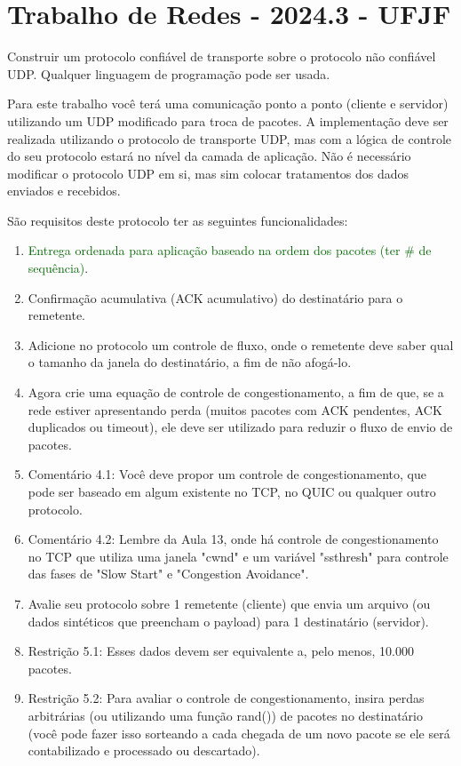 \documentclass[12pt]{article}
\begin{document}
\section*{Trabalho de Redes - 2024.3 - UFJF}

Construir um protocolo confiável de transporte sobre o protocolo não confiável UDP. Qualquer linguagem de programação pode ser usada.

\vspace{2em}

Para este trabalho você terá uma comunicação ponto a ponto (cliente e servidor) utilizando um UDP modificado para troca de pacotes. A implementação deve ser realizada utilizando o protocolo de transporte UDP, mas com a lógica de controle do seu protocolo estará no nível da camada de aplicação. Não é necessário modificar o protocolo UDP em si, mas sim colocar tratamentos dos dados enviados e recebidos.

São requisitos deste protocolo ter as seguintes funcionalidades:

\begin{enumerate}
    \item \textcolor{darkgreen}{Entrega ordenada para aplicação baseado na ordem dos pacotes (ter \# de sequência)}.
    \item Confirmação acumulativa (ACK acumulativo) do destinatário para o remetente.
    \item Adicione no protocolo um controle de fluxo, onde o remetente deve saber qual o tamanho da janela do destinatário, a fim de não afogá-lo.
    \item Agora crie uma equação de controle de congestionamento, a fim de que, se a rede estiver apresentando perda (muitos pacotes com ACK pendentes, ACK duplicados ou timeout), ele deve ser utilizado para reduzir o fluxo de envio de pacotes. 
    \item Comentário 4.1: Você deve propor um controle de congestionamento, que pode ser baseado em algum existente no TCP, no QUIC ou qualquer outro protocolo. 
    \item Comentário 4.2: Lembre da Aula 13, onde há controle de congestionamento no TCP que utiliza uma janela "cwnd" e um variável "ssthresh" para controle das fases de "Slow Start" e "Congestion Avoidance".
    \item Avalie seu protocolo sobre 1 remetente (cliente) que envia um arquivo (ou dados sintéticos que preencham o payload) para 1 destinatário (servidor). 
    \item Restrição 5.1: Esses dados devem ser equivalente a, pelo menos, 10.000 pacotes. 
    \item Restrição 5.2: Para avaliar o controle de congestionamento, insira perdas arbitrárias (ou utilizando uma função rand()) de pacotes no destinatário (você pode fazer isso sorteando a cada chegada de um novo pacote se ele será contabilizado e processado ou descartado).
\end{enumerate}
\end{document}
